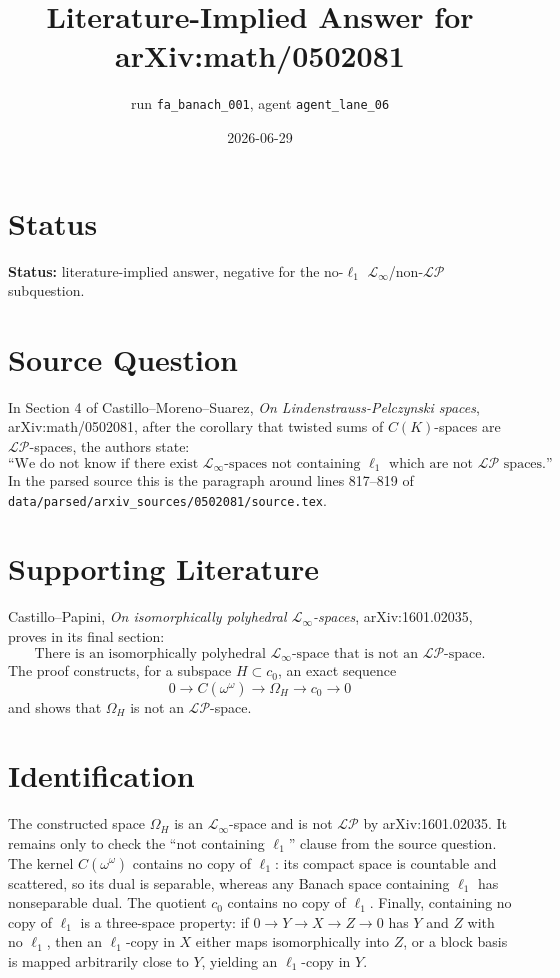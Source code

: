\documentclass[11pt]{article}
\title{Literature-Implied Answer for arXiv:math/0502081}
\author{run \texttt{fa\_banach\_001}, agent \texttt{agent\_lane\_06}}
\date{2026-06-29}
\newcommand{\LP}{\mathcal{LP}}
\begin{document}
\maketitle

\section*{Status}

\textbf{Status:} literature-implied answer, negative for the no-\(\ell_1\)
\(\mathcal L_\infty\)/non-\(\LP\) subquestion.

\section*{Source Question}

In Section 4 of Castillo--Moreno--Suarez, \emph{On
Lindenstrauss-Pelczynski spaces}, arXiv:math/0502081, after the corollary that
twisted sums of \(C(K)\)-spaces are \(\LP\)-spaces, the authors state:
\[
\text{``We do not know if there exist }\mathcal L_\infty\text{-spaces not
containing }\ell_1\text{ which are not }\LP\text{ spaces.''}
\]
In the parsed source this is the paragraph around lines 817--819 of
\texttt{data/parsed/arxiv\_sources/0502081/source.tex}.

\section*{Supporting Literature}

Castillo--Papini, \emph{On isomorphically polyhedral
\(\mathcal L_\infty\)-spaces}, arXiv:1601.02035, proves in its final section:
\[
\text{There is an isomorphically polyhedral }\mathcal L_\infty\text{-space
that is not an }\LP\text{-space.}
\]
The proof constructs, for a subspace \(H\subset c_0\), an exact sequence
\[
0\longrightarrow C(\omega^\omega)\longrightarrow \Omega_H
\longrightarrow c_0\longrightarrow 0
\]
and shows that \(\Omega_H\) is not an \(\LP\)-space.

\section*{Identification}

The constructed space \(\Omega_H\) is an \(\mathcal L_\infty\)-space and is
not \(\LP\) by arXiv:1601.02035. It remains only to check the ``not containing
\(\ell_1\)'' clause from the source question. The kernel \(C(\omega^\omega)\)
contains no copy of \(\ell_1\): its compact space is countable and scattered,
so its dual is separable, whereas any Banach space containing \(\ell_1\) has
nonseparable dual. The quotient \(c_0\) contains no copy of \(\ell_1\).
Finally, containing no copy of \(\ell_1\) is a three-space property: if
\(0\to Y\to X\to Z\to 0\) has \(Y\) and \(Z\) with no \(\ell_1\), then an
\(\ell_1\)-copy in \(X\) either maps isomorphically into \(Z\), or a block
basis is mapped arbitrarily close to \(Y\), yielding an \(\ell_1\)-copy in
\(Y\).
\end{document}
